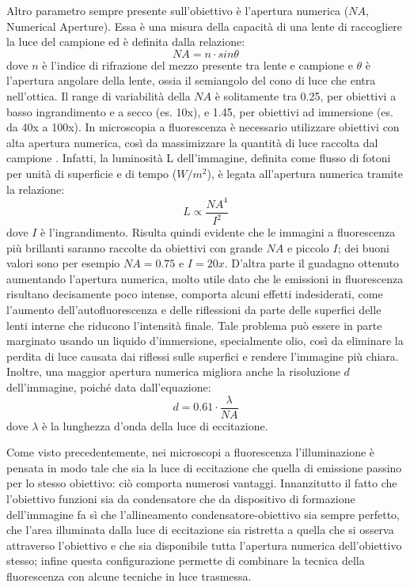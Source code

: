 Altro parametro sempre presente sull'obiettivo è l'apertura numerica ($NA$, Numerical Aperture). Essa è una misura della capacità di una lente di raccogliere la luce del campione ed è definita dalla relazione:
$$ NA = n \cdot sin \theta $$
dove $n$ è l'indice di rifrazione del mezzo presente tra lente e campione e $\theta$ è l'apertura angolare della lente, ossia il semiangolo del cono di luce che entra nell'ottica. Il range di variabilità della $NA$ è solitamente tra 0.25, per obiettivi a basso ingrandimento e a secco (es. 10x), e 1.45, per obiettivi ad immersione (es. da 40x a 100x). In microscopia a fluorescenza è necessario utilizzare obiettivi con alta apertura numerica, così da massimizzare la quantità di luce raccolta dal campione \cite{NA}. Infatti, la luminosità L dell'immagine, definita come flusso di fotoni per unità di superficie e di tempo ($W/m^2$), è legata all'apertura numerica tramite la relazione:
$$L  \propto  \frac {NA^4}{I^2}$$
dove $I$ è l'ingrandimento. Risulta quindi evidente che le immagini a fluorescenza più brillanti saranno raccolte da obiettivi con grande $NA$ e piccolo $I$; dei buoni valori sono per esempio $NA=0.75$ e $I=20x$.
D'altra parte il guadagno ottenuto aumentando l'apertura numerica, molto utile dato che le emissioni in fluorescenza risultano decisamente poco intense, comporta alcuni effetti indesiderati, come l'aumento dell'autofluorescenza e delle riflessioni da parte delle superfici delle lenti interne che riducono l'intensità finale. Tale problema può essere in parte marginato usando un liquido d'immersione, specialmente olio, così da eliminare la perdita di luce
causata dai riflessi sulle superfici e rendere l'immagine più chiara. 
Inoltre, una maggior apertura numerica migliora anche la risoluzione $d$ dell'immagine, poiché data dall'equazione:
$$d = 0.61 \cdot \frac {\lambda}{NA} $$
dove $\lambda$ è la lunghezza d'onda della luce di eccitazione.

Come visto precedentemente, nei microscopi a fluorescenza l'illuminazione è pensata in modo tale che sia la luce di eccitazione che quella di emissione passino per lo stesso obiettivo: ciò comporta numerosi vantaggi. Innanzitutto il fatto che l'obiettivo funzioni sia da condensatore che da dispositivo di formazione dell'immagine fa sì che l'allineamento condensatore-obiettivo sia sempre perfetto, che l'area illuminata dalla luce di eccitazione sia ristretta a quella che si osserva attraverso l'obiettivo e che sia disponibile tutta l'apertura numerica dell'obiettivo stesso; infine questa configurazione permette di combinare la tecnica della fluorescenza con alcune tecniche in luce trasmessa.


